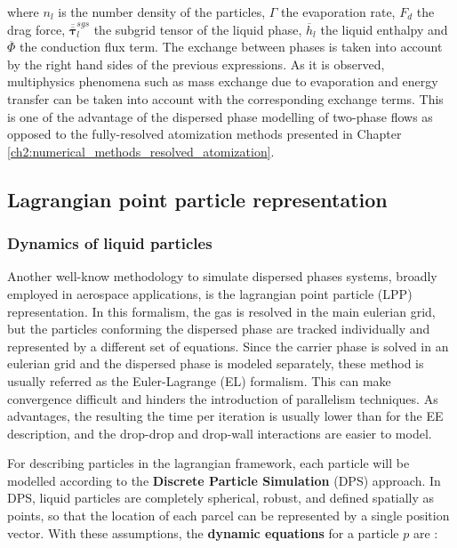 where $n_l$ is the number density of the particles, $\Gamma$ the evaporation rate, $F_{d}$ the drag force, $\overline{\overline{\pmb{\tau}}}_l^{sgs}$ the subgrid tensor of the liquid phase, $\overline{h}_l$ the liquid enthalpy and $\overline{\Phi}$ the conduction flux term. The exchange between phases is taken into account by the right hand sides of the previous expressions. As it is observed, multiphysics phenomena such as mass exchange due to evaporation and energy transfer can be taken into account with the corresponding exchange terms.  This is one of the advantage of the dispersed phase modelling of two-phase flows as opposed to the fully-resolved atomization methods presented in Chapter \ref{ch2:numerical_methods_resolved_atomization}. 

\subsection{Lagrangian point particle representation}
\label{sec:ch3_EL_formalisms}

\subsubsection*{Dynamics of liquid particles}

Another well-know methodology to simulate dispersed phases systems, broadly employed in aerospace applications, is the lagrangian point particle (LPP) representation. In this formalism, the gas is resolved in the main eulerian grid, but the particles conforming the dispersed phase are tracked individually and represented by a different set of equations. Since the carrier phase is solved in an eulerian grid and the dispersed phase is modeled separately, these method is usually referred as the Euler-Lagrange (EL) formalism. This can make convergence difficult and hinders the introduction of parallelism techniques. As advantages, the resulting the time per iteration is usually lower than for the EE description, and the drop-drop and drop-wall interactions are easier to model.

For describing particles in the lagrangian framework, each particle will be modelled according to the \textbf{Discrete Particle Simulation} (DPS) approach. In DPS, liquid particles are completely spherical, robust, and defined spatially as points, so that the location of each parcel can be represented by a single position vector. With these assumptions, the \textbf{dynamic equations} for a particle $p$ are :

